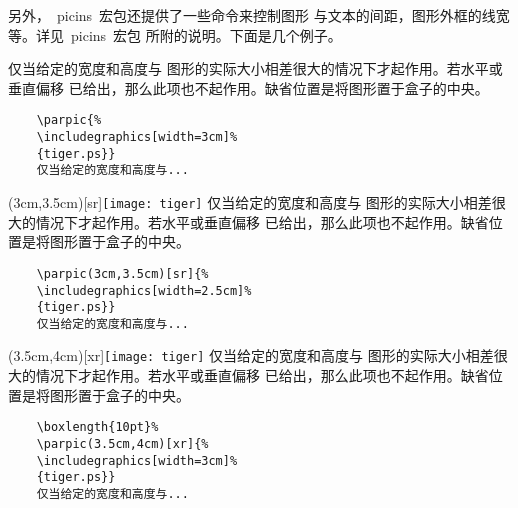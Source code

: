 另外，~\textsf{picins}~宏包还提供了一些命令来控制图形
与文本的间距，图形外框的线宽等。详见~\textsf{picins}~宏包
所附的说明。下面是几个例子。

\hspace{-1.5cm}\begin{minipage}[b]{.5\textwidth}
	仅当给定的宽度和高度与
	图形的实际大小相差很大的情况下才起作用。若水平或垂直偏移
	已给出，那么此项也不起作用。缺省位置是将图形置于盒子的中央。
	\par\vspace{0pt}
\end{minipage}%
\hspace{10pt}\begin{minipage}[b]{.5\textwidth}
	\begin{Verbatim}
	\parpic{%
	\includegraphics[width=3cm]%
	{tiger.ps}}
	仅当给定的宽度和高度与...
	\end{Verbatim}
	\par\vspace{0pt}
\end{minipage}

\hspace{-1.5cm}\begin{minipage}[b]{.5\textwidth}
	\parpic(3cm,3.5cm)[sr]{\texttt{[image: tiger]}}
	仅当给定的宽度和高度与
	图形的实际大小相差很大的情况下才起作用。若水平或垂直偏移
	已给出，那么此项也不起作用。缺省位置是将图形置于盒子的中央。
	\par\vspace{0pt}
\end{minipage}%
\hspace{10pt}\begin{minipage}[b]{.5\textwidth}
	\begin{Verbatim}
	\parpic(3cm,3.5cm)[sr]{%
	\includegraphics[width=2.5cm]%
	{tiger.ps}}
	仅当给定的宽度和高度与...
	\end{Verbatim}
	\par\vspace{0pt}
\end{minipage}

\hspace{-1.5cm}\begin{minipage}[b]{.5\textwidth}
	\boxlength{10pt}%
	\parpic(3.5cm,4cm)[xr]{\texttt{[image: tiger]}}
	仅当给定的宽度和高度与
	图形的实际大小相差很大的情况下才起作用。若水平或垂直偏移
	已给出，那么此项也不起作用。缺省位置是将图形置于盒子的中央。
	\par\vspace{0pt}
\end{minipage}%
\hspace{10pt}\begin{minipage}[b]{.5\textwidth}
	\begin{Verbatim}
	\boxlength{10pt}%
	\parpic(3.5cm,4cm)[xr]{%
	\includegraphics[width=3cm]%
	{tiger.ps}}
	仅当给定的宽度和高度与...
	\end{Verbatim}
	\par\vspace{0pt}
\end{minipage}


